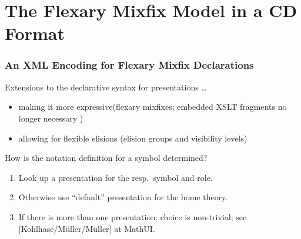 \documentclass[pdftex,xcolor=svgnames]{beamer}
\newcommand{\ExprColor}[1]{\textcolor[RGB]{38,134,102}{#1}}%
\newcommand{\ElisColor}[1]{\textcolor[RGB]{134,38,38}{#1}}%
\begin{document}
\section[Content Dictionary Format]{The Flexary Mixfix Model in a CD Format}
\label{sec:omdoc2}

\begin{frame}
  \frametitle{An XML Encoding for Flexary Mixfix Declarations}
  Extensions to the declarative {\omdoc} syntax for presentations …
  \begin{itemize}
  \item making it \ExprColor{more expressive}\newline (\ExprColor{flexary
      mixfixes}; embedded XSLT fragments no longer necessary {\large\smiley})
  \item allowing for \ElisColor{flexible elisions}\newline
    (\ElisColor{elision groups} and \ElisColor{visibility levels})
  \end{itemize}
  How is the notation definition for a symbol determined?
  \begin{enumerate}
  \item Look up a presentation for the resp.\ symbol and role.
  \item Otherwise use ``default'' presentation for the home theory.
  \item If there is more than one presentation: choice is non-trivial; see
    [Kohlhase/Müller/Müller] at MathUI.
  \end{enumerate}
\end{frame}
\end{document}
